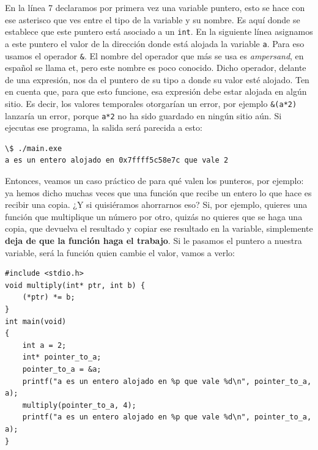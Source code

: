 \documentclass[a4paper]{article}
\begin{document}
En la línea 7 declaramos por primera vez una variable puntero, esto se hace
con ese asterisco que ves entre el tipo de la variable y su nombre. Es aquí
donde se establece que este puntero está asociado a un \verb!int!. En la
siguiente línea asignamos a este puntero el valor de la dirección donde está
alojada la variable \verb!a!. Para eso usamos el operador \verb!&!.
El nombre del operador que más se usa es \textit{ampersand}, en español se llama
et, pero este nombre es poco conocido.
Dicho operador, delante de
una expresión, nos da el puntero de su tipo a donde su valor esté alojado.
Ten en cuenta que, para que esto funcione, esa expresión debe estar alojada
en algún sitio. Es decir, los valores temporales otorgarían un error, por
ejemplo \verb!&(a*2)! lanzaría un error, porque \verb!a*2! no ha sido guardado
en ningún sitio aún.
Si ejecutas ese programa, la salida será parecida a esto:


\noindent
\begin{minipage}[H]{\linewidth}
\mbox{}
\begin{lstlisting}[style=terminalStyle]
\$ ./main.exe
a es un entero alojado en 0x7ffff5c58e7c que vale 2
\end{lstlisting}
\end{minipage}


Entonces, veamos un caso práctico de para qué valen los punteros, por ejemplo:
ya hemos dicho muchas veces que una función que recibe un entero lo que hace
es recibir una copia. ¿Y si quisiéramos ahorrarnos eso? Si, por ejemplo, quieres
una función que multiplique un número por otro, quizás no quieres que se haga
una copia, que devuelva el resultado y copiar ese resultado en la variable,
simplemente \textbf{deja de que la función haga el trabajo}. Si le pasamos
el puntero a nuestra variable, será la función quien cambie el valor, vamos a
verlo:


\noindent
\begin{minipage}[H]{\linewidth}
\mbox{}
\begin{lstlisting}[style=C, label={lst:pointers1},
caption={Declaración de punteros}]
#include <stdio.h>
void multiply(int* ptr, int b) {
    (*ptr) *= b;
}
int main(void)
{
    int a = 2;
    int* pointer_to_a;
    pointer_to_a = &a;
    printf("a es un entero alojado en %p que vale %d\n", pointer_to_a, a);
    multiply(pointer_to_a, 4);
    printf("a es un entero alojado en %p que vale %d\n", pointer_to_a, a);
}
\end{lstlisting}
\end{minipage}
\end{document}
